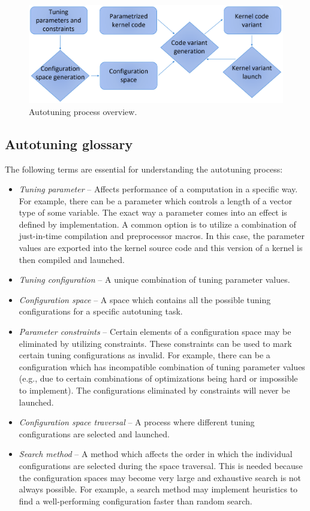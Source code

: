 \documentclass[
  digital,     %
  oneside,     %
  nosansbold,  %
  nocolorbold, %
  lof,         %
  lot,         %
  nocover
]{fithesis4}
\begin{document}
\begin{figure}
	\begin{center}
	\includegraphics[width=125mm]{Figures/AutotuningSchema.png}
	\end{center}
	\caption{Autotuning process overview.}
	\label{autotuning-schema}
\end{figure}

\subsection{Autotuning glossary}
The following terms are essential for understanding the autotuning process:
\begin{itemize}
	\item \textit{Tuning parameter} -- Affects performance of a computation in a specific way. For example, there can be a parameter which controls a length of a vector type of some variable. The exact way a parameter comes into an effect is defined by implementation. A common option is to utilize a combination of just-in-time compilation and preprocessor macros. In this case, the parameter values are exported into the kernel source code and this version of a kernel is then compiled  and launched.
	\item \textit{Tuning configuration} -- A unique combination of tuning parameter values.
	\item \textit{Configuration space} -- A space which contains all the possible tuning configurations for a specific autotuning task.
	\item \textit{Parameter constraints} -- Certain elements of a configuration space may be eliminated by utilizing constraints. These constraints can be used to mark certain tuning configurations as invalid. For example, there can be a configuration which has incompatible combination of tuning parameter values (e.g., due to certain combinations of optimizations being hard or impossible to implement). The configurations eliminated by constraints will never be launched.
	\item \textit{Configuration space traversal} -- A process where different tuning configurations are selected and launched.
	\item \textit{Search method} -- A method which affects the order in which the individual configurations are selected during the space traversal. This is needed because the configuration spaces may become very large and exhaustive search is not always possible. For example, a search method may implement heuristics to find a well-performing configuration faster than random search.
\end{itemize}
\end{document}
